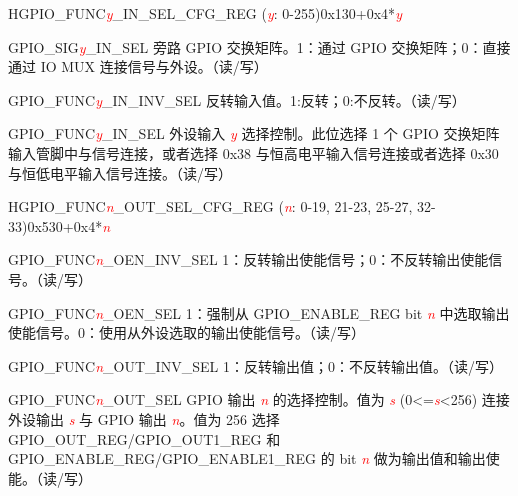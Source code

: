 \begin{register}{H}{GPIO\_FUNC\textcolor{red}{\it{y}}\_IN\_SEL\_CFG\_REG (\textcolor{red}{\it{y}}: 0-255)}{0x130+0x4*\textcolor{red}{\it{y}}}\label{regdesc:GPIOFUNCnINSELCFGREG}
%
%
%
%
\regnewline%
\begin{regdesc}\begin{reglist}
\item [GPIO\_SIG\textcolor{red}{\it{y}}\_IN\_SEL]旁路 GPIO 交换矩阵。1：通过 GPIO 交换矩阵；0：直接通过 IO MUX 连接信号与外设。（读/写）
\item [GPIO\_FUNC\textcolor{red}{\it{y}}\_IN\_INV\_SEL]反转输入值。1:反转；0:不反转。（读/写）
\item [GPIO\_FUNC\textcolor{red}{\it{y}}\_IN\_SEL]外设输入 \textcolor{red}{\it{y}} 选择控制。此位选择 1 个 GPIO 交换矩阵输入管脚中与信号连接，或者选择 0x38 与恒高电平输入信号连接或者选择 0x30 与恒低电平输入信号连接。（读/写） 
\end{reglist}\end{regdesc}
\end{register}


\begin{register}{H}{GPIO\_FUNC\textcolor{red}{\it{n}}\_OUT\_SEL\_CFG\_REG (\textcolor{red}{\it{n}}: 0-19, 21-23, 25-27, 32-33)}{0x530+0x4*\textcolor{red}{\it{n}}}\label{regdesc:GPIOFUNCnOUTSELCFGREG}
%
%
%
%
%
\regnewline%
\begin{regdesc}\begin{reglist}
\item [GPIO\_FUNC\textcolor{red}{\it{n}}\_OEN\_INV\_SEL]1：反转输出使能信号；0：不反转输出使能信号。（读/写）
\label{fielddesc:GPIOFUNCNOENSEL} \item [GPIO\_FUNC\textcolor{red}{\it{n}}\_OEN\_SEL]1：强制从 GPIO\_ENABLE\_REG bit \textcolor{red}{\it{n}} 中选取输出使能信号。0：使用从外设选取的输出使能信号。（读/写）
\item [GPIO\_FUNC\textcolor{red}{\it{n}}\_OUT\_INV\_SEL]1：反转输出值；0：不反转输出值。（读/写）
\item [GPIO\_FUNC\textcolor{red}{\it{n}}\_OUT\_SEL] GPIO 输出 \textcolor{red}{\it{n}} 的选择控制。值为  \textcolor{red}{\it{s}} (0<=\textcolor{red}{\it{s}}<256) 连接外设输出 \textcolor{red}{\it{s}} 与 GPIO 输出 \textcolor{red}{\it{n}}。值为 256 选择 GPIO\_OUT\_REG/GPIO\_OUT1\_REG 和 GPIO\_ENABLE\_REG/GPIO\_ENABLE1\_REG 的 bit \textcolor{red}{\it{n}} 做为输出值和输出使能。（读/写）
\end{reglist}\end{regdesc}
\end{register}
